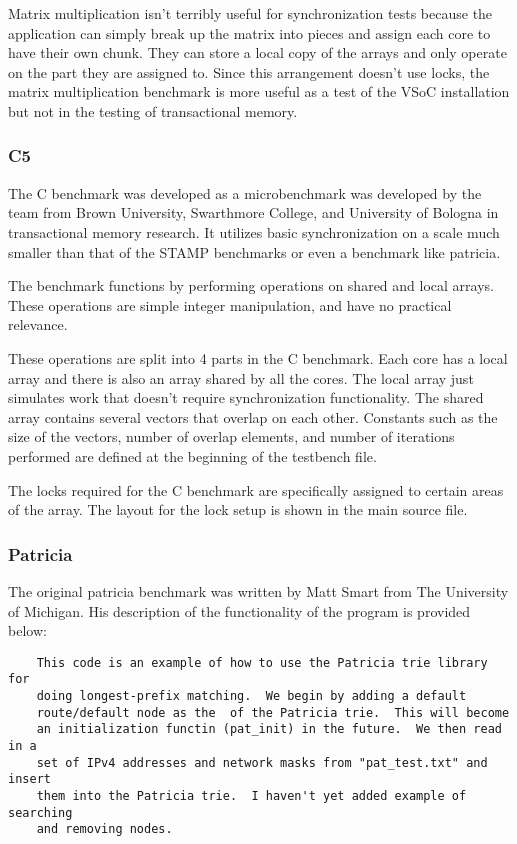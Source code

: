 \documentclass{article}
\begin{document}
Matrix multiplication isn't terribly useful for synchronization tests because 
the application can simply break up the matrix into pieces and assign each 
core to have their own chunk.  They can store a local copy of the arrays and 
only operate on the part they are assigned to. Since this arrangement doesn't 
use locks, the matrix multiplication benchmark is more useful as a test of the 
VSoC installation but not in the testing of transactional memory. 

\subsubsection{C5}

The C benchmark was developed as a microbenchmark was developed by the team
from Brown University, Swarthmore College, and University of Bologna in 
transactional memory research. It utilizes basic synchronization on a scale 
much smaller than that of the STAMP benchmarks or even a benchmark like 
patricia.

The benchmark functions by performing operations on shared and local arrays. 
These operations are simple integer manipulation, and have no practical 
relevance. 

These operations are split into 4 parts in the C benchmark. Each core has a 
local array and there is also an array shared by all the cores. The local 
array just simulates work that doesn't require synchronization functionality. 
The shared array contains several vectors that overlap on each other. 
Constants such as the size of the vectors, number of overlap elements, and 
number of iterations performed are defined at the beginning of the testbench
 file. 

The locks required for the C benchmark are specifically assigned to certain 
areas of the array. The layout for the lock setup is shown in the main source 
file.

\subsubsection{Patricia}

The original patricia benchmark was written by Matt Smart from The University of
 Michigan. His description of the functionality of the program is provided
below:

\begin{verbatim}
    This code is an example of how to use the Patricia trie library for
    doing longest-prefix matching.  We begin by adding a default
    route/default node as the  of the Patricia trie.  This will become
    an initialization functin (pat_init) in the future.  We then read in a
    set of IPv4 addresses and network masks from "pat_test.txt" and insert
    them into the Patricia trie.  I haven't yet added example of searching
    and removing nodes.
\end{verbatim}
\end{document}
